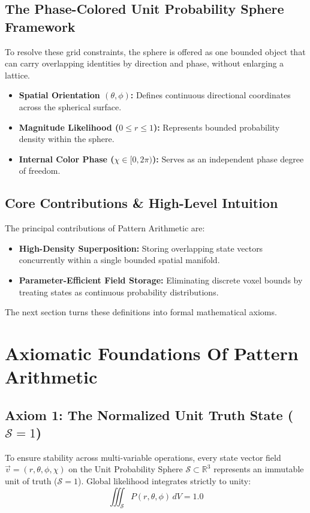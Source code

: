 \documentclass[12pt, a4paper]{article}
\begin{document}
\subsection{The Phase-Colored Unit Probability Sphere Framework}
To resolve these grid constraints, the sphere is offered as one bounded object that can carry overlapping identities by direction and phase, without enlarging a lattice.
\begin{itemize}
    \item \textbf{Spatial Orientation $(\theta, \phi)$:} Defines continuous directional coordinates across the spherical surface.
    \item \textbf{Magnitude Likelihood ($0 \leq r \leq 1$):} Represents bounded probability density within the sphere.
    \item \textbf{Internal Color Phase ($\chi \in [0, 2\pi)$):} Serves as an independent phase degree of freedom.
\end{itemize}

\subsection{Core Contributions \& High-Level Intuition}
The principal contributions of Pattern Arithmetic are:
\begin{itemize}
    \item \textbf{High-Density Superposition:} Storing overlapping state vectors concurrently within a single bounded spatial manifold.
    \item \textbf{Parameter-Efficient Field Storage:} Eliminating discrete voxel bounds by treating states as continuous probability distributions.
\end{itemize}

The next section turns these definitions into formal mathematical axioms.


\section{Axiomatic Foundations Of Pattern Arithmetic}

\subsection{Axiom 1: The Normalized Unit Truth State ($\mathcal{S} = 1$)}
\label{subsec:axiom1}
To ensure stability across multi-variable operations, every state vector field $\vec{v} = (r, \theta, \phi, \chi)$ on the Unit Probability Sphere $\mathcal{S} \subset \mathbb{R}^3$ represents an immutable unit of truth ($\mathcal{S} = 1$). Global likelihood integrates strictly to unity:
\begin{equation}
    \iiint_{\mathcal{S}} P(r, \theta, \phi) \, dV = 1.0
    \label{eq:unit_truth}
\end{equation}
\end{document}
